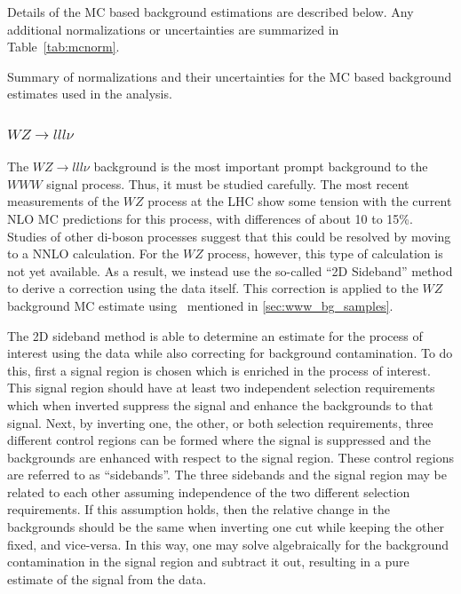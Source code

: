 
Details of the MC based background estimations are described below.
Any additional normalizations or uncertainties are summarized
in Table~\ref{tab:mcnorm}.

\begin{table}[htp]
\centering

\caption{Summary of normalizations and their uncertainties for the
MC based background estimates used in the analysis.}
\label{tab:mcnorm}
\end{table}



\subsubsection{$WZ\rightarrow lll\nu$}
\label{sec:wzbg}

The $WZ\rightarrow lll \nu$ background is the most important prompt background 
to the $WWW$ signal process. Thus, it must be studied carefully.
The most recent measurements of the $WZ$ process at the LHC
\cite{Aad:2012twa,Anger:1663539,CMS-PAS-SMP-12-006} 
show some tension with the current NLO MC predictions for this process, 
with differences of about 10 to 15\%. 
Studies of other di-boson processes 
\cite{Grazzini:2015nwa,Cascioli:2014yka}
suggest that this could be resolved by 
moving to a NNLO calculation.
For the $WZ$ process, however, this type of calculation is not yet available.
As a result, we instead use the so-called ``2D Sideband'' method
\cite{Aad:2013izg} to derive a correction using the data itself.
This correction is applied to the $WZ$ background MC estimate using
\powheg~mentioned in \sec\ref{sec:www_bg_samples}.

The 2D sideband method is able to determine an estimate
for the process of interest using the data while also correcting
for background contamination. 
To do this, first a signal region 
is chosen which is enriched in the process of interest.
This signal region should have at least two 
independent selection requirements which when inverted suppress
the signal and enhance the backgrounds to that signal.
Next, by inverting one, the other, or both selection requirements, 
three different control regions can be formed
where the signal is suppressed and the backgrounds are enhanced 
with respect to the signal region. 
These control regions are referred to as ``sidebands''.
The three sidebands and the signal region may be
related to each other assuming independence of the two different selection
requirements. If this assumption holds, then the relative change in the 
backgrounds should be the same
when inverting one cut while keeping the other fixed, and vice-versa.
In this way, one may solve algebraically for the background contamination 
in the signal region and subtract it out, resulting in a pure
estimate of the signal from the data. 


